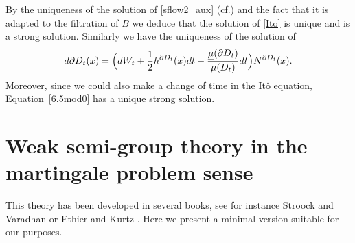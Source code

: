 \documentclass[10pt]{amsart}
\theoremstyle{plain}
\theoremstyle{definition}
\let\f\frac
\providecommand{\cf}{cf.}\providecommand{\etc}{etc.}
\begin{document}
By the uniqueness of the solution of \eqref{sflow2_aux} (\cf \cite[Th.\,22]{zbMATH07470497}) and the fact that it is adapted to the filtration of $B $ we deduce that the solution of \eqref{Ito} is unique and is a strong solution. Similarly we have the uniqueness of the solution of
\[
d \partial D_t (x) =\Bigl(dW_t+\f12h^{\partial D_t}(x)dt - \frac{\underline{\mu}( \partial D_t)}{\mu(D_t)} dt\Bigr)N^{\partial D_t}(x).
\]
Moreover, since we could also make a change of time in the Itô equation, Equation~\eqref{6.5mod0} has a unique strong solution.

\section{Weak semi-group theory in the martingale problem sense}\label{appD}

This theory has been developed in several books, see for instance Stroock and Varadhan \cite{MR2190038} or Ethier and Kurtz \cite{MR838085}.
Here we present a minimal version suitable for our purposes.
\end{document}
